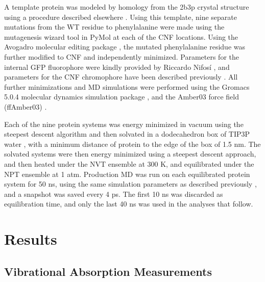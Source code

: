 A template protein was modeled by homology from the 2b3p crystal structure\cite{Pedelacq2006} using a procedure described elsewhere \cite{Slocum2017}.
Using this template, nine separate mutations from the WT residue to phenylalanine were made using the mutagenesis wizard tool in PyMol\cite{DeLano2002} at each of the CNF locations.
Using the Avogadro molecular editing package \cite{Hanwell2012}, the mutated phenylalanine residue was further modified to CNF and independently minimized.
Parameters for the internal GFP fluorophore were kindly provided by Riccardo Nifos\'i \cite{Nifosi2003}, and parameters for the CNF chromophore have been described previously \cite{Slocum2017}.
All further minimizations and MD simulations were performed using the Gromacs 5.0.4 molecular dynamics simulation package \cite{VanDerSpoel2005, Abraham2015}, and the Amber03 force field (ffAmber03) \cite{Duan2003, Sorin2005}. 

Each of the nine protein systems was energy minimized in vacuum using the steepest descent algorithm and then solvated in a dodecahedron box of TIP3P water \cite{Jorgensen1983}, with a minimum distance of protein to the edge of the box of 1.5 nm.
The solvated systems were then energy minimized using a steepest descent approach, and then heated under the NVT ensemble at 300 K, and equilibrated under the NPT ensemble at 1 atm.
Production MD was run on each equilibrated protein system for 50 ns, using the same simulation parameters as described previously \cite{Slocum2017}, and a snapshot was saved every 4 ps.
The first 10 ns was discarded as equilibration time, and only the last 40 ns was used in the analyses that follow.

\section{Results}
\subsection{Vibrational Absorption Measurements}

